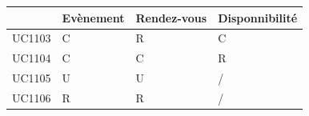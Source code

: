 \documentclass[a4paper, 11pt]{report}
\begin{document}
\begin{center}
	\begin{longtable}{|p{2.2cm}|p{2.2cm}|p{2.2cm}|p{2.2cm}|}
		\hline
		& Evènement & Rendez-vous & Disponnibilité  \\
		\hline
		UC1103 & C & R & C \\
		\hline 
		UC1104 & C & C & R \\
		\hline
		UC1105 & U & U & / \\
		\hline
		UC1106 & R & R & / \\
		\hline

	\end{longtable}
\end{center}
\end{document}
